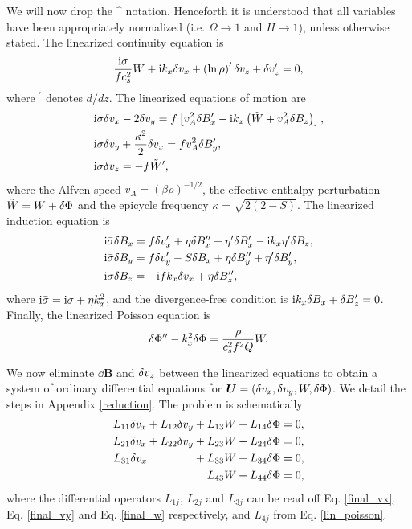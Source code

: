 We will now drop the $\hat{\phantom{a}}$ notation. Henceforth it is
understood that all variables have been appropriately normalized
(i.e. $\Omega\to 1$ and $H\to 1$), unless otherwise stated. The
linearized continuity equation is 
\begin{align}
  \frac{\mathrm{i}\sigma}{fc_s^2}W + \mathrm{i} k_x \delta v_x
  +\left(\ln\rho\right)^\prime\delta v_z + \delta v_z^\prime = 0,\label{lin_cont}
\end{align}
where $^\prime$ denotes $d/dz$. The linearized equations of motion are
\begin{align}
  &\mathrm{i}\sigma \delta v_x - 2\delta v_y = f\left[v_A^2\delta B_x^\prime - \mathrm{i} k_x
    \left(\tilde{W} + v_A^2\delta B_z
    \right)\right],\\
  &\mathrm{i}\sigma\delta v_y + \frac{\kappa^2}{2}\delta v_x = fv_A^2\delta B_y^\prime,\\
  & \mathrm{i}\sigma\delta v_z = -f\tilde{W}^\prime,
\end{align}
where the Alfven speed $v_A =
\left(\beta\rho\right)^{-1/2}$, the effective enthalpy perturbation
$\tilde{W} = W + \delta \Phi$ and the epicycle frequency $\kappa=\sqrt{2(2-S)}$. 
The linearized induction equation is
\begin{align}
&  \mathrm{i}\bar{\sigma}\delta B_x = f\delta v_x^\prime +
  \eta\delta B_x^{\prime\prime}+\eta^\prime\delta B_x^\prime - \mathrm{i} k_x
  \eta^\prime \delta B_z,\label{induct_x}\\
&\mathrm{i}\bar{\sigma}\delta B_y = f\delta v_y^\prime - S\delta B_x +
  \eta\delta B_y^{\prime\prime}+\eta^\prime\delta B_y^\prime,\label{induct_y}\\
& \mathrm{i}\bar{\sigma}\delta B_z = -\mathrm{i} f k_x \delta v_x + \eta\delta B_z^{\prime\prime}, \label{induct_vert}
\end{align}
where $\mathrm{i}\bar{\sigma} = \mathrm{i}\sigma + \eta k_x^2$, and the
divergence-free condition is $\mathrm{i} k_x\delta B_x + \delta B_z^\prime=0$. Finally,
the linearized Poisson equation is
\begin{align}
  \delta \Phi^{\prime\prime} - k_x^2\delta \Phi = \frac{\rho}{c_s^2f^2Q}W.  \label{lin_poisson}
\end{align}

We now eliminate $\dd\bm{B}$ and $\delta v_z$ between the linearized
equations to obtain a system of ordinary differential equations for
$\bm{U}=\left(\delta v_x,\delta v_y,W,\delta \Phi\right)$. We detail the steps 
in Appendix \ref{reduction}. The problem is schematically 
\begin{align}
  L_{11}\dvx + L_{12}\dvy + L_{13}W + L_{14}\dphi &= 0, \label{lin1}\\
  L_{21}\dvx + L_{22}\dvy + L_{23}W + L_{24}\dphi &= 0, \label{lin2}\\
  L_{31}\dvx \quad\quad\quad\,\,\,\,\,\,\, + L_{33}W + L_{34}\dphi &=0,\label{lin3}\\
  \phantom{L_{31}\dvx + L_{22}\dvy +} L_{43}W + L_{44}\dphi
  &=0\label{lin4}, 
\end{align}
where the differential operators $L_{1j}$, $L_{2j}$ and $L_{3j}$ can
be read off Eq. \ref{final_vx}, Eq. \ref{final_vy} and 
Eq. \ref{final_w} respectively, and $L_{4j}$ from
Eq. \ref{lin_poisson}. 

